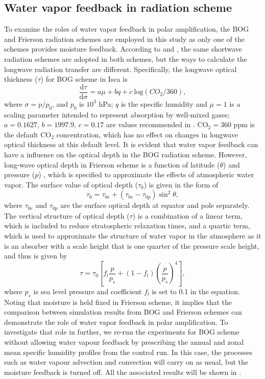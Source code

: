 \subsection{Water vapor feedback in radiation scheme} \label{sec:wv_fb_setup}
To examine the roles of water vapor feedback in polar amplification, the BOG and Frierson radiation schemes are employed in this study as only one of the schemes provides moisture feedback. According to \cite{Byrne2013} and \cite{Frierson2006}, the same shortwave radiation schemes are adopted in both schemes, but the ways to calculate the longwave radiation transfer are different. Specifically, the longwave optical thickness ($\tau$) for BOG scheme in Isca is
\begin{equation}\label{eq:bog_tau}
\frac{\text{d}\tau}{\text{d}\sigma}=a\mu+bq+c~\text{log}(CO_2/360),
\end{equation}
where $\sigma = p/p_0$, and $p_0$ is $10^3$ hPa; $q$ is the specific humidity and $\mu=1$ is a scaling parameter intended to represent absorption by well-mixed gases; $a=0.1627$, $b=1997.9$, $c=0.17$ are values recommended in \cite{Vallis2018}. CO$_2=360$ ppm is the default CO$_2$ concentration, which has no effect on changes in longwave optical thickness at this default level. It is evident that water vapor feedback can have a influence on the optical depth in the BOG radiation scheme. However, long-wave optical depth in Frierson scheme is a function of latitude ($\theta$) and pressure ($p$) \citep{Frierson2006}, which is specified to approximate the effects of atmospheric water vapor. The surface value of optical depth ($\tau_0$) is given in the form of
\begin{equation}\label{eq:frierson_lw_optical_depth1}
\tau_0 = \tau_{0e}+(\tau_{0e}-\tau_{0p})\operatorname{sin}^2\theta,
\end{equation}
where $\tau_{0e}$ and $\tau_{0p}$ are the surface optical depth at equator and pole separately. The vertical structure of optical depth ($\tau$) is a combination of a linear term, which is included to reduce stratospheric relaxation times, and a quartic term, which is used to approximate the structure of water vapor in the atmosphere as it is an absorber with a scale height that is one quarter of the pressure scale height, and thus is given by
\begin{equation}\label{eq:frierson_lw_optical_depth2}
\tau=\tau_0\left[f_l\frac{p}{p_s}+(1-f_l)\left(\frac{p}{p_s}\right)^4\right],
\end{equation}
where $p_s$ is sea level pressure and coefficient $f_l$ is set to 0.1 in the equation. Noting that moisture is held fixed in Frierson scheme, it implies that the comparison between simulation results from BOG and Frierson schemes can demonstrate the role of water vapor feedback in polar amplification. To investigate that role in further, we re-run the experiments for BOG scheme without allowing water vapour feedback by prescribing the annual and zonal mean specific humidity profiles from the control run. In this case, the processes such as water vapour advection and convection will carry on as usual, but the moisture feedback is turned off. All the associated results will be shown in .

